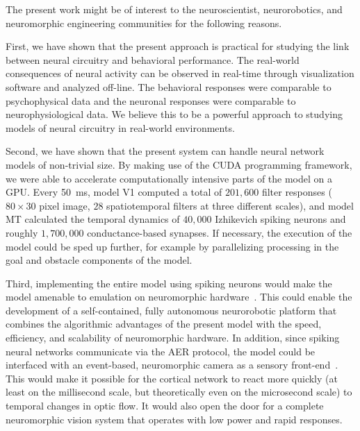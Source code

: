 The present work might be of interest to the neuroscientist,
neurorobotics, and neuromorphic engineering communities for
the following reasons.

First, we have shown that the present approach is practical
for studying the link between neural circuitry and behavioral
performance. The real-world consequences of neural activity can
be observed in real-time through visualization software and
analyzed off-line. The behavioral responses were comparable to
psychophysical data and the neuronal responses were comparable
to neurophysiological data. We believe this to be a powerful
approach to studying models of neural circuitry in real-world
environments.

Second, we have shown that the present system can handle
neural network models of non-trivial size. By making use of
the CUDA programming framework, we were able to accelerate
computationally intensive parts of the model on a \ac{GPU}. Every
\SI{50}{\milli\second}, model \ac{V1} computed a total of 
$201,600$ filter responses ($80\times30$ pixel image, $28$ 
spatiotemporal filters at three different scales), 
and model \ac{MT} calculated the temporal dynamics of $40,000$
Izhikevich spiking neurons and roughly $1,700,000$ conductance-based
synapses. If necessary, the execution of the model could be
sped up further, for example by parallelizing processing in the goal
and obstacle components of the model.

Third, implementing the entire model using spiking neurons
would make the model amenable to emulation on neuromorphic
hardware~\citep{Cassidy2014,Schemmel2010,Srinivasa2012}.
This could enable the development of a self-contained,
fully autonomous neurorobotic platform that combines
the algorithmic advantages of the present model with the speed,
efficiency, and scalability of neuromorphic hardware. In addition,
since spiking neural networks communicate via the \ac{AER} protocol,
the model could be interfaced with an event-based, neuromorphic
camera as a sensory front-end~\citep{Lichtsteiner2008}. This would
make it possible for the cortical network to react more quickly
(at least on the millisecond scale, but theoretically even on the
microsecond scale) to temporal changes in optic flow. It would
also open the door for a complete neuromorphic vision system that
operates with low power and rapid responses.

